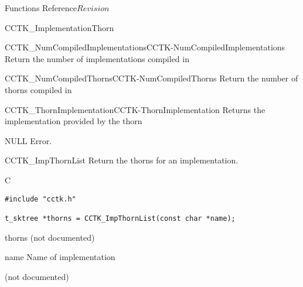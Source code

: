 \begin{cactuspart}{ Functions Reference}{}{$Revision$}
\begin{FunctionDescription}{CCTK\_ImplementationThorn}
\begin{SeeAlsoSection}
\begin{SeeAlso2}{CCTK\_NumCompiledImplementations}{CCTK-NumCompiledImplementations}
  Return the number of implementations compiled in
\end{SeeAlso2}
\begin{SeeAlso2}{CCTK\_NumCompiledThorns}{CCTK-NumCompiledThorns}
  Return the number of thorns compiled in
\end{SeeAlso2}
\begin{SeeAlso2}{CCTK\_ThornImplementation}{CCTK-ThornImplementation}
  Returns the implementation provided by the thorn
\end{SeeAlso2}
\end{SeeAlsoSection}

\begin{ErrorSection}
\begin{Error}{NULL}
Error.
\end{Error}
\end{ErrorSection}

\end{FunctionDescription}



\begin{FunctionDescription}{CCTK\_ImpThornList}
\label{CCTK-ImpThornList}
Return the thorns for an implementation.

\begin{SynopsisSection}
\begin{Synopsis}{C}
\begin{verbatim}
#include "cctk.h"

t_sktree *thorns = CCTK_ImpThornList(const char *name);
\end{verbatim}
\end{Synopsis}
\end{SynopsisSection}

\begin{ResultSection}
\begin{Result}{thorns}
(not documented)
\end{Result}
\end{ResultSection}

\begin{ParameterSection}
\begin{Parameter}{name}
Name of implementation
\end{Parameter}
\end{ParameterSection}

\begin{Discussion}
(not documented)
\end{Discussion}


\end{FunctionDescription}
\end{cactuspart}
